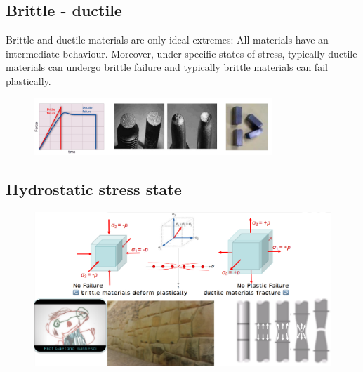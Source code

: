 \documentclass[class=report, crop=false, 12pt,a4paper]{standalone}
\begin{document}
\subsection{Brittle - ductile}
Brittle and ductile materials are only ideal extremes: All materials have an intermediate behaviour. Moreover, under specific states of stress, typically ductile materials can undergo brittle failure and typically brittle materials can fail plastically. 
\begin{figure}[H]
  \centering
  \includegraphics[width = 0.8\textwidth]{../img/diagram75.png}
  \caption{}
\end{figure}
\subsection{Hydrostatic stress state}
\begin{figure}[H]
  \centering
  \includegraphics[width =\textwidth]{../img/diagram76.png}
  \caption{}
\end{figure}
\end{document}
